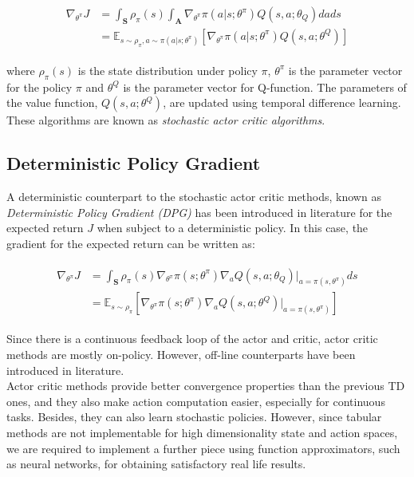 
\begin{align}
	\begin{split}
		\nabla_{\theta^\pi}J &= \int_{\textbf{S}}\rho_\pi(s) \int_{\textbf{A}} \nabla_{\theta^\pi} \pi (a|s; \theta^\pi)Q(s, a; \theta_Q)dads \\
		&	= \mathbb{E}_{s\sim\rho_\pi, a\sim\pi(a|s; \theta^\pi)} [\nabla_{\theta^\pi} \pi(a|s; \theta^\pi)Q(s,a; \theta^Q)]
	\end{split} 
\end{align}

where $\rho_\pi(s)$ is the state distribution under policy $\pi$, $\theta^\pi$ is the parameter vector for the policy $\pi$ and $\theta^Q$ is the parameter vector for Q-function. The parameters of the value function, $Q(s, a; \theta^Q)$, are updated using temporal difference learning. These algorithms are known as \textit{stochastic actor critic algorithms}.

\subsection{Deterministic Policy Gradient}
 A deterministic counterpart to the stochastic actor critic methods, known as \textit{Deterministic Policy Gradient (DPG)} has been introduced in literature for the expected return $J$ when subject to a deterministic policy. In this case, the gradient for the expected return can be written as:

\begin{align}
\label{eq:DPG}
	\begin{split}
		\nabla_{\theta^\pi}J &= \int_{\textbf{S}}\rho_\pi(s) \nabla_{\theta^\pi} \pi (s; \theta^\pi) \nabla_a Q(s, a; \theta_Q)|_{a=\pi(s, \theta^\pi)}ds \\
		 &= \mathbb{E}_{s\sim\rho_\pi} [\nabla_{\theta^\pi} \pi(s; \theta^\pi)\nabla_a Q(s,a; \theta^Q)|_{a=\pi(s, \theta^\pi)}] 	 
	\end{split}
\end{align}

 Since there is a continuous feedback loop of the actor and critic, actor critic methods are mostly on-policy. However, off-line counterparts have been introduced in literature.
\\
\indent Actor critic methods provide better convergence properties than the previous TD ones, and they also make action computation easier, especially for continuous tasks. Besides, they can also learn stochastic policies. However, since tabular methods are not implementable for high dimensionality state and action spaces, we are required to implement a further piece using function approximators, such as neural networks, for obtaining satisfactory real life results.

